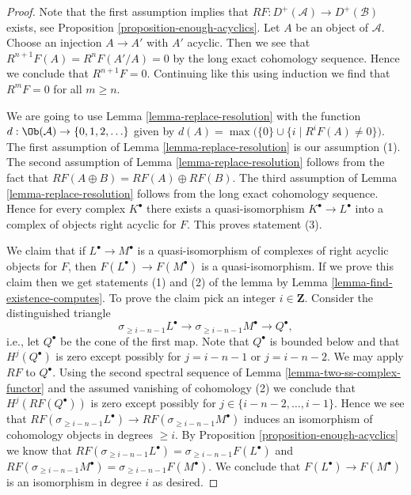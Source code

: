 \begin{proof}
Note that the first assumption implies that
$RF : D^+(\mathcal{A}) \to D^+(\mathcal{B})$ exists, see
Proposition \ref{proposition-enough-acyclics}.
Let $A$ be an object of $\mathcal{A}$. Choose an injection $A \to A'$
with $A'$ acyclic. Then we see that $R^{n + 1}F(A) = R^nF(A'/A) = 0$ by
the long exact cohomology sequence. Hence we conclude that $R^{n + 1}F = 0$.
Continuing like this using induction we find that $R^mF = 0$ for all
$m \geq n$.

\medskip\noindent
We are going to use Lemma \ref{lemma-replace-resolution} with the function
$d : \Ob(\mathcal{A}) \to \{0, 1, 2, \ldots \}$ given by
$d(A) = \max\bigl(\{0\} \cup \{i \mid R^iF(A) \not = 0\}\bigr)$.
The first assumption of Lemma \ref{lemma-replace-resolution}
is our assumption (1). The second assumption of
Lemma \ref{lemma-replace-resolution} follows from the fact
that $RF(A \oplus B) = RF(A) \oplus RF(B)$. The third assumption of
Lemma \ref{lemma-replace-resolution} follows from the long exact
cohomology sequence. Hence for every complex $K^\bullet$ there exists a
quasi-isomorphism $K^\bullet \to L^\bullet$ into a complex of
objects right acyclic for $F$. This proves statement (3).

\medskip\noindent
We claim that if $L^\bullet \to M^\bullet$ is a quasi-isomorphism of
complexes of right acyclic objects for $F$, then
$F(L^\bullet) \to F(M^\bullet)$
is a quasi-isomorphism. If we prove this claim then we get statements
(1) and (2) of the lemma by
Lemma \ref{lemma-find-existence-computes}.
To prove the claim pick an integer $i \in \mathbf{Z}$.
Consider the distinguished triangle
$$
\sigma_{\geq i - n - 1}L^\bullet \to
\sigma_{\geq i - n - 1}M^\bullet \to Q^\bullet,
$$
i.e., let $Q^\bullet$ be the cone of the first map.
Note that $Q^\bullet$ is bounded below and that
$H^j(Q^\bullet)$ is zero except possibly for $j = i - n - 1$
or $j = i - n - 2$. We may apply $RF$ to $Q^\bullet$.
Using the second spectral sequence of
Lemma \ref{lemma-two-ss-complex-functor}
and the assumed vanishing of cohomology (2) we conclude
that $H^j(RF(Q^\bullet))$ is zero except possibly for
$j \in \{i - n - 2, \ldots, i - 1\}$. Hence we see that
$RF(\sigma_{\geq i - n - 1}L^\bullet) \to RF(\sigma_{\geq i - n - 1}M^\bullet)$
induces an isomorphism of cohomology objects in degrees $\geq i$.
By Proposition \ref{proposition-enough-acyclics} we know that
$RF(\sigma_{\geq i - n - 1}L^\bullet) = \sigma_{\geq i - n - 1}F(L^\bullet)$
and
$RF(\sigma_{\geq i - n - 1}M^\bullet) = \sigma_{\geq i - n - 1}F(M^\bullet)$.
We conclude that $F(L^\bullet) \to F(M^\bullet)$
is an isomorphism in degree $i$ as desired.


\end{proof}
